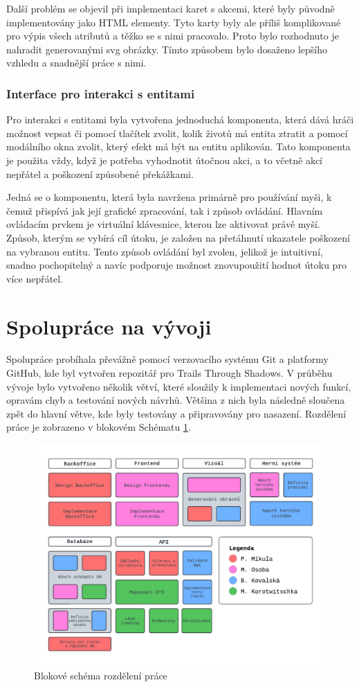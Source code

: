Další problém se objevil při implementaci karet s akcemi, které byly původně implementovány jako HTML elementy. Tyto karty byly ale příliš komplikované pro výpis všech atributů a těžko se s nimi pracovalo. Proto bylo rozhodnuto je nahradit generovanými svg obrázky. Tímto způsobem bylo dosaženo lepšího vzhledu a snadnější práce s nimi.

\subsubsection*{Interface pro interakci s entitami}
Pro interakci s entitami byla vytvořena jednoduchá komponenta, která dává hráči možnost vepsat či pomocí tlačítek zvolit, kolik životů má entita ztratit a pomocí modálního okna zvolit, který efekt má být na entitu aplikován. Tato komponenta je použita vždy, když je potřeba vyhodnotit útočnou akci, a to včetně akcí nepřátel a poškození způsobené překážkami.

Jedná se o komponentu, která byla navržena primárně pro používání myši, k čemuž přispívá jak její grafické zpracování, tak i způsob ovládání. Hlavním ovládacím prvkem je virtuální klávesnice, kterou lze aktivovat právě myší. Způsob, kterým se vybírá cíl útoku, je založen na přetáhnutí ukazatele poškození na vybranou entitu. Tento způsob ovládání byl zvolen, jelikož je intuitivní, snadno pochopitelný a navíc podporuje možnost znovupoužití hodnot útoku pro více nepřátel.

\section{Spolupráce na vývoji}
Spolupráce probíhala převážně pomocí verzovacího systému Git a platformy GitHub, kde byl vytvořen repozitář pro Trails Through Shadows. V průběhu vývoje bylo vytvořeno několik větví, které sloužily k implementaci nových funkcí, opravám chyb a testování nových návrhů. Většina z nich byla následně sloučena zpět do hlavní větve, kde byly testovány a připravovány pro nasazení. Rozdělení práce je zobrazeno v blokovém Schématu \ref{fig:workflow}.

\begin{figure}[H]
  \centering
  \includegraphics[width=.95\textwidth]{../../shared/diagrams/blocks.pdf}
  \caption{Blokové schéma rozdělení práce}
  \label{fig:workflow}
\end{figure}

